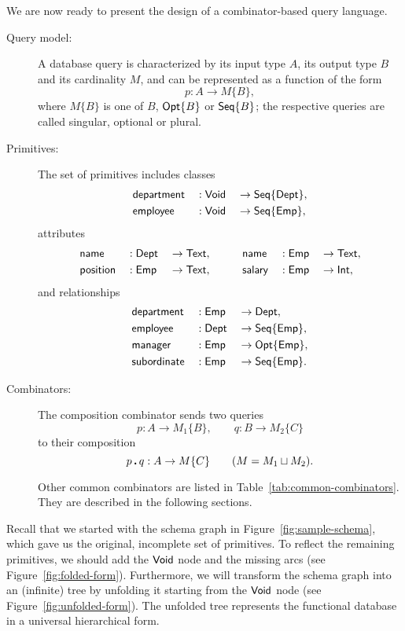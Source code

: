 We are now ready to present the design of a combina\-tor-based query language.



\begin{description}
\item[Query model:]
A database query is characterized by its input type $A$, its output type $B$
and its cardinality $M$, and can be represented as a function of the form
\begin{equation*}
    p : A \to M\{B\},
\end{equation*}
where $M\{B\}$ is one of $B$, $\mathsf{Opt}{\left\{B\right\}}$ or $\mathsf{Seq}{\left\{B\right\}}$; the respective queries
are called singular, optional or plural.

\item[Primitives:]
The set of primitives includes classes
\begin{alignat*}{3}
    & \mathsf{department} && : \mathsf{Void} && \to \mathsf{Seq}{\left\{\mathsf{Dept}\right\}}, \\
    & \mathsf{employee} && : \mathsf{Void} && \to \mathsf{Seq}{\left\{\mathsf{Emp}\right\}},
\end{alignat*}
attributes
\begin{alignat*}{6}
    & \mathsf{name} && : \mathsf{Dept} && \to \mathsf{Text}, \qquad
    && \mathsf{name} && : \mathsf{Emp} && \to \mathsf{Text}, \\
    & \mathsf{position} && : \mathsf{Emp} && \to \mathsf{Text}, \qquad
    && \mathsf{salary} && : \mathsf{Emp} && \to \mathsf{Int},
\end{alignat*}
and relationships
\begin{alignat*}{3}
    & \mathsf{department} && : \mathsf{Emp} && \to \mathsf{Dept}, \\
    & \mathsf{employee} && : \mathsf{Dept} && \to \mathsf{Seq}{\left\{\mathsf{Emp}\right\}}, \\
    & \mathsf{manager} && : \mathsf{Emp} && \to \mathsf{Opt}{\left\{\mathsf{Emp}\right\}}, \\
    & \mathsf{subordinate} && : \mathsf{Emp} && \to \mathsf{Seq}{\left\{\mathsf{Emp}\right\}}.
\end{alignat*}

\item[Combinators:]
The composition combinator sends two queries
\begin{equation*}
    p : A \to M_1\{B\}, \qquad
    q : B \to M_2\{C\}
\end{equation*}
to their composition
\begin{equation*}
    p\,\boldsymbol{.}\,q : A \to M\{C\} \qquad (M = M_1 \sqcup M_2).
\end{equation*}

Other common combinators are listed in Table~\ref{tab:common-combinators}.
They are described in the following sections.
\end{description}



Recall that we started with the schema graph in Figure~\ref{fig:sample-schema},
which gave us the original, incomplete set of primitives.  To reflect the
remaining primitives, we should add the $\mathsf{Void}$ node and the missing arcs (see
Figure~\ref{fig:folded-form}).  Furthermore, we will transform the schema graph
into an (infinite) tree by unfolding it starting from the $\mathsf{Void}$ node (see
Figure~\ref{fig:unfolded-form}).  The unfolded tree represents the functional
database in a universal hierarchical form.


